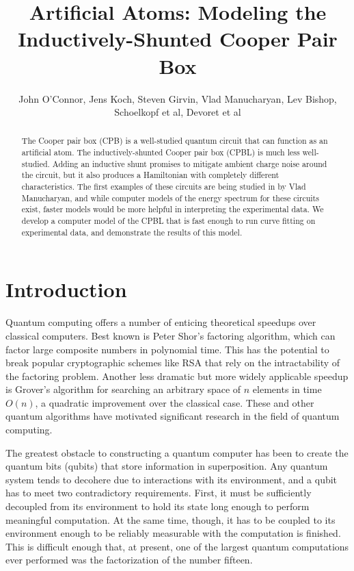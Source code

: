 \documentclass[twocolumn]{revtex4}
\begin{document}
\title{Artificial Atoms: Modeling the Inductively-Shunted Cooper Pair
  Box}
\author{John O'Connor, Jens Koch, Steven Girvin, Vlad Manucharyan, Lev
  Bishop, Schoelkopf et al, Devoret et al}

\begin{abstract}
  The Cooper pair box (CPB) is a well-studied quantum circuit that can
  function as an artificial atom. The inductively-shunted Cooper pair
  box (CPBL) is much less well-studied. Adding an inductive shunt
  promises to mitigate ambient charge noise around the circuit, but it
  also produces a Hamiltonian with completely different
  characteristics. The first examples of these circuits are being
  studied in by Vlad Manucharyan, and while computer models of the
  energy spectrum for these circuits exist, faster models would be
  more helpful in interpreting the experimental data. We develop a
  computer model of the CPBL that is fast enough to run curve fitting
  on experimental data, and demonstrate the results of this model.
\end{abstract}

\maketitle

\section{Introduction}

Quantum computing offers a number of enticing theoretical speedups
over classical computers. Best known is Peter Shor's factoring
algorithm, which can factor large composite numbers in polynomial
time. This has the potential to break popular cryptographic schemes
like RSA that rely on the intractability of the factoring
problem. Another less dramatic but more widely applicable speedup is
Grover's algorithm for searching an arbitrary space of $n$ elements in
time $O(n)$, a quadratic improvement over the classical case. These
and other quantum algorithms have motivated significant research in
the field of quantum computing.

The greatest obstacle to constructing a quantum computer has been to
create the quantum bits (qubits) that store information in
superposition. Any quantum system tends to decohere due to
interactions with its environment, and a qubit has to meet two
contradictory requirements. First, it must be sufficiently decoupled
from its environment to hold its state long enough to perform
meaningful computation. At the same time, though, it has to be coupled
to its environment enough to be reliably measurable with the
computation is finished. This is difficult enough that, at present,
one of the largest quantum computations ever performed was the
factorization of the number fifteen.\cite{Vandersypen}
\end{document}
